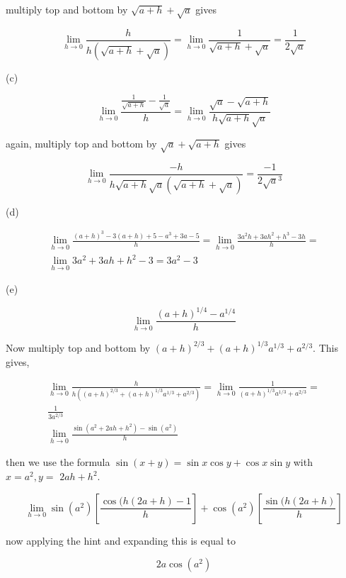 \documentclass[10pt]{article}
\begin{document}
multiply top and bottom by $\sqrt{a+h}+\sqrt{a}$ gives

$$
\lim _{h \rightarrow 0} \frac{h}{h(\sqrt{a+h}+\sqrt{a})}=\lim _{h \rightarrow 0} \frac{1}{\sqrt{a+h}+\sqrt{a}}=\frac{1}{2 \sqrt{a}}
$$

(c)

$$
\lim _{h \rightarrow 0} \frac{\frac{1}{\sqrt{a+h}}-\frac{1}{\sqrt{a}}}{h}=\lim _{h \rightarrow 0} \frac{\sqrt{a}-\sqrt{a+h}}{h \sqrt{a+h} \sqrt{a}}
$$

again, multiply top and bottom by $\sqrt{a}+\sqrt{a+h}$ gives

$$
\lim _{h \rightarrow 0} \frac{-h}{h \sqrt{a+h} \sqrt{a}(\sqrt{a+h}+\sqrt{a})}=\frac{-1}{2 \sqrt{a}^{3}}
$$

(d)

$$
\begin{gathered}
\lim _{h \rightarrow 0} \frac{(a+h)^{3}-3(a+h)+5-a^{3}+3 a-5}{h}=\lim _{h \rightarrow 0} \frac{3 a^{2} h+3 a h^{2}+h^{3}-3 h}{h}= \\
\lim _{h \rightarrow 0} 3 a^{2}+3 a h+h^{2}-3=3 a^{2}-3
\end{gathered}
$$

(e)

$$
\lim _{h \rightarrow 0} \frac{(a+h)^{1 / 4}-a^{1 / 4}}{h}
$$

Now multiply top and bottom by $(a+h)^{2 / 3}+(a+h)^{1 / 3} a^{1 / 3}+a^{2 / 3}$. This gives,


\begin{gather*}
\lim _{h \rightarrow 0} \frac{h}{h\left((a+h)^{2 / 3}+(a+h)^{1 / 3} a^{1 / 3}+a^{2 / 3}\right)}=\lim _{h \rightarrow 0} \frac{1}{(a+h)^{1 / 3} a^{1 / 3}+a^{2 / 3}}= \\
\frac{1}{3 a^{2 / 3}} \\
\lim _{h \rightarrow 0} \frac{\sin \left(a^{2}+2 a h+h^{2}\right)-\sin \left(a^{2}\right)}{h} \tag{f}
\end{gather*}


then we use the formula $\sin (x+y)=\sin x \cos y+\cos x \sin y$ with $x=a^{2}, y=$ $2 a h+h^{2}$.

$$
\lim _{h \rightarrow 0} \sin \left(a^{2}\right)\left[\frac{\cos (h(2 a+h)-1}{h}\right]+\cos \left(a^{2}\right)\left[\frac{\sin (h(2 a+h)}{h}\right]
$$

now applying the hint and expanding this is equal to

$$
2 a \cos \left(a^{2}\right)
$$
\end{document}
